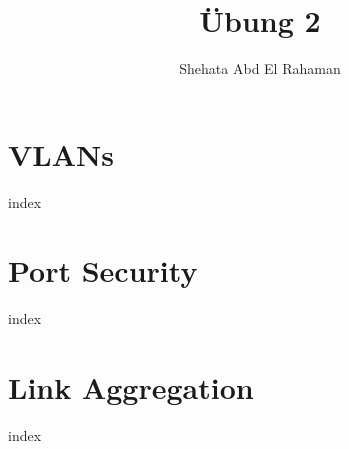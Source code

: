 \documentclass[12pt,letterpaper]{article}
\title{\"Ubung 2}
\author{Shehata Abd El Rahaman}
\date{}
\begin{document}
\maketitle

\tableofcontents

\clearpage
\pagebreak
\section{VLANs}
{index}
\clearpage
\pagebreak
\section{Port Security}
{index}
\clearpage
\pagebreak
\section{Link Aggregation}
{index}

% 
% 
% 

% 
% 
% 
\end{document}
